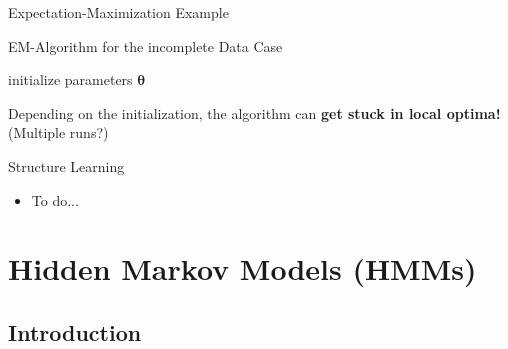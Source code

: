 \begin{frame}{Expectation-Maximization Example}{}
\end{frame}


\begin{frame}{EM-Algorithm for the incomplete Data Case}{}
	\begin{algorithm}[H]
		\DontPrintSemicolon
		\footnotesize
		initialize parameters $\bm{\theta}$\;
 		\caption{Expectation-Maximization Algorithm}
	\end{algorithm}

	\begin{boxBlueNoFrame}
		 Depending on the initialization, the algorithm can \textbf{get stuck in local optima!}
		(Multiple runs?)
	\end{boxBlueNoFrame}
\end{frame}


\begin{frame}{Structure Learning}{}
	\begin{itemize}
		\item To do...
	\end{itemize}
\end{frame}


\section{Hidden Markov Models (HMMs)}

\subsection{Introduction}

